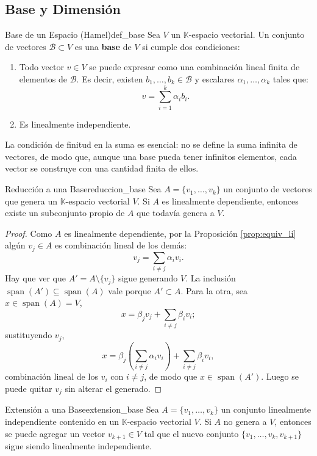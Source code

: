 \documentclass[11pt, a4paper]{article}
\begin{document}
\subsection{Base y Dimensión}

\begin{definicion}{Base de un Espacio (Hamel)}{def_base}
Sea $V$ un $\mathbb{K}$-espacio vectorial. Un conjunto de vectores $\mathcal{B} \subset V$ es una \textbf{base} de $V$ si cumple dos condiciones:
\begin{enumerate}
    \item Todo vector $v \in V$ se puede expresar como una combinación lineal finita de elementos de $\mathcal{B}$.
    Es decir, existen $b_1, \dots, b_k \in \mathcal{B}$ y escalares $\alpha_1, \dots, \alpha_k$ tales que:
    \[ v = \sum_{i=1}^k \alpha_i b_i. \]
    \item Es linealmente independiente.
\end{enumerate}
\end{definicion}

\obs La condición de finitud en la suma es esencial: no se define la suma infinita de vectores, de modo que, aunque una base pueda tener infinitos elementos, cada vector se construye con una cantidad finita de ellos.

\begin{proposicion}{Reducción a una Base}{reduccion_base}
Sea $A = \{v_1, \dots, v_k\}$ un conjunto de vectores que genera un $\mathbb{K}$-espacio vectorial $V$. Si $A$ es linealmente dependiente, entonces existe un subconjunto propio de $A$ que todavía genera a $V$.
\end{proposicion}

\begin{proof}
Como $A$ es linealmente dependiente, por la Proposición \ref{prop:equiv_li} algún $v_j \in A$ es combinación lineal de los demás:
\[
v_j = \sum_{i \neq j} \alpha_i v_i.
\]
Hay que ver que $A' = A \setminus \{v_j\}$ sigue generando $V$. La inclusión $\operatorname{span}(A') \subseteq \operatorname{span}(A)$ vale porque $A' \subset A$. Para la otra, sea $x \in \operatorname{span}(A) = V$,
\[
x = \beta_j v_j + \sum_{i \neq j} \beta_i v_i;
\]
sustituyendo $v_j$,
\[
x = \beta_j \left( \sum_{i \neq j} \alpha_i v_i \right) + \sum_{i \neq j} \beta_i v_i,
\]
combinación lineal de los $v_i$ con $i \neq j$, de modo que $x \in \operatorname{span}(A')$. Luego se puede quitar $v_j$ sin alterar el generado.
\end{proof}

\begin{proposicion}{Extensión a una Base}{extension_base}
Sea $A = \{v_1, \dots, v_k\}$ un conjunto linealmente independiente contenido en un $\mathbb{K}$-espacio vectorial $V$. Si $A$ no genera a $V$, entonces se puede agregar un vector $v_{k+1} \in V$ tal que el nuevo conjunto $\{v_1, \dots, v_k, v_{k+1}\}$ sigue siendo linealmente independiente.
\end{proposicion}
\end{document}
